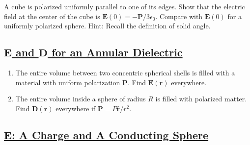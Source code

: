 A cube is polarized uniformly parallel to one of its edges. Show that the electric field at the center of the cube is $\mathbf{E}(0)=-\mathbf{P} / 3 \epsilon_{0} .$ Compare with $\mathbf{E}(0)$ for a uniformly polarized sphere. Hint: Recall the definition of solid angle.

\subsection{\hyperref[E and D for an Annular Dielectric]{$\mathbf{E}$ and $\mathbf{D}$ for an Annular Dielectric}}

\begin{enumerate}
	\item The entire volume between two concentric spherical shells is filled with a material with uniform polarization $\mathbf{P}$. Find $\mathbf{E}(\mathbf{r})$ everywhere.
	\item The entire volume inside a sphere of radius $R$ is filled with polarized matter. Find $\mathbf{D}(\mathbf{r})$ everywhere if $\mathbf{P}=P \hat{\mathbf{r}} / r^{2}$.
\end{enumerate}


\subsection{\hyperref[E: A Charge and A Conducting Sphere]{E: A Charge and A Conducting Sphere}}

